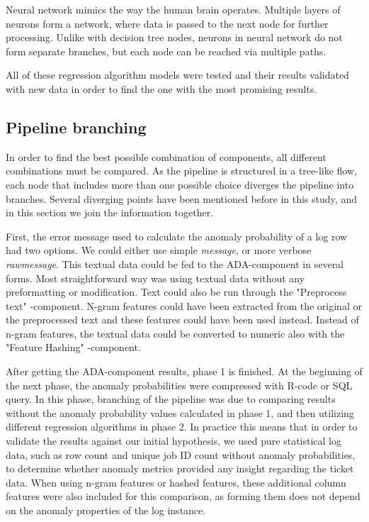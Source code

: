 Neural network mimics the way the human brain operates.
Multiple layers of neurons form a network,
where data is passed to the next node for further processing.
Unlike with decision tree nodes,
neurons in neural network do not form separate branches,
but each node can be reached via multiple paths.~\cite{mahesh2020machine}

All of these regression algorithm models
were tested and their results validated with new data
in order to find the one with the most promising results.



\subsection{Pipeline branching}\label{subsec:pipe-branching}

In order to find the best possible combination of components,
all different combinations must be compared.
As the pipeline is structured in a tree-like flow,
each node that includes more than one possible choice
diverges the pipeline into branches.
Several diverging points have been mentioned before in this study,
and in this section we join the information together.

First,
the error message used to calculate the anomaly probability of a log row
had two options.
We could either use simple \textit{message},
or more verbose \textit{rawmessage}.
This textual data could be fed to the ADA-component in several forms.
Most straightforward way was using textual data without any preformatting or modification.
Text could also be run through the "Preprocess text" -component.
N-gram features could have been extracted from the original or the preprocessed text
and these features could have been used instead.
Instead of n-gram features,
the textual data could be converted to numeric
also with the "Feature Hashing" -component.

After getting the ADA-component results,
phase 1 is finished.
At the beginning of the next phase,
the anomaly probabilities were compressed with R-code or SQL query.\@
In this phase,
branching of the pipeline was due to
comparing results without the anomaly probability values calculated in phase 1,
and then utilizing different regression algorithms in phase 2.
In practice this means
that in order to validate the results against our initial hypothesis,
we used pure statistical log data,
such as row count and unique job ID count
without anomaly probabilities,
to determine whether anomaly metrics provided any insight regarding the ticket data.
When using n-gram features or hashed features,
these additional column features were also included for this comparison,
as forming them does not depend on the anomaly properties of the log instance.

